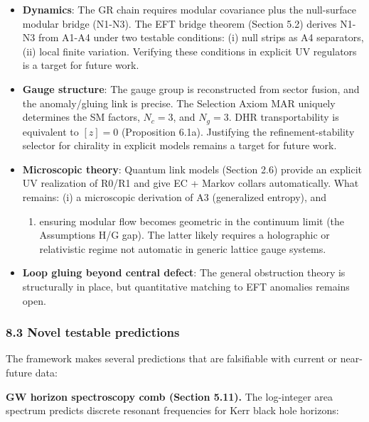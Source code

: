 \documentclass[11pt,a4paper]{article}
\theoremstyle{remark}
\providecommand{\tightlist}{%
  \setlength{\itemsep}{0pt}\setlength{\parskip}{0pt}}
\begin{document}
\begin{itemize}
\tightlist
\item
  \textbf{Dynamics}: The GR chain requires modular covariance plus the null-surface
  modular bridge (N1-N3). The EFT bridge theorem (Section 5.2) derives
  N1-N3 from A1-A4 under two testable conditions: (i) null strips as A4
  separators, (ii) local finite variation. Verifying these conditions in explicit UV regulators is a target for future work.
\item
  \textbf{Gauge structure}: The gauge group is reconstructed from sector fusion,
  and the anomaly/gluing link is precise. The Selection Axiom MAR uniquely
  determines the SM factors, \(N_c = 3\), and \(N_g = 3\). DHR transportability
  is equivalent to \([z]=0\) (Proposition 6.1a). Justifying the
  refinement-stability selector for chirality in explicit models remains
  a target for future work.
\item
  \textbf{Microscopic theory}: Quantum link models (Section 2.6) provide an
  explicit UV realization of R0/R1 and give EC + Markov collars automatically.
  What remains: (i) a microscopic derivation of A3 (generalized entropy), and

  \begin{enumerate}
  \def\labelenumi{(\roman{enumi})}
  \setcounter{enumi}{1}
  \tightlist
  \item
    ensuring modular flow becomes geometric in the continuum limit (the
    Assumptions H/G gap). The latter likely requires a holographic or relativistic
    regime not automatic in generic lattice gauge systems.
  \end{enumerate}
\item
  \textbf{Loop gluing beyond central defect}: The general obstruction theory is
  structurally in place, but quantitative matching to EFT anomalies remains
  open.
\end{itemize}

\subsubsection{8.3 Novel testable predictions}\label{novel-testable-predictions}

The framework makes several predictions that are falsifiable with current or
near-future data:

\textbf{GW horizon spectroscopy comb (Section 5.11).} The log-integer area spectrum predicts discrete resonant frequencies for Kerr black hole horizons:
\end{document}
